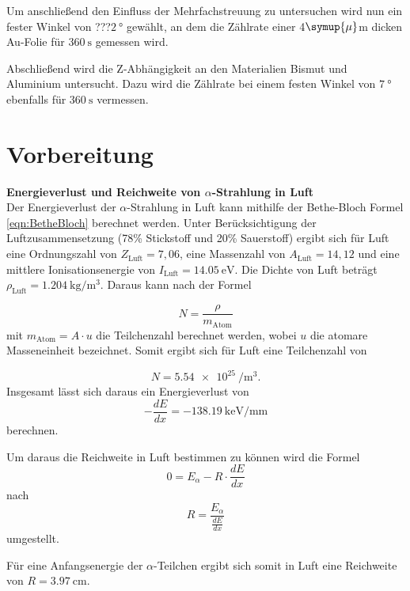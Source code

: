 Um anschließend den Einfluss der Mehrfachstreuung zu untersuchen wird nun ein fester Winkel von ???$\SI{2}{\degree}$
gewählt, an dem die Zählrate einer 4\:$\symup{\mu}$m dicken Au-Folie für $\SI{360}{\s}$ gemessen wird.

Abschließend wird die Z-Abhängigkeit an den Materialien Bismut und Aluminium untersucht. Dazu wird die Zählrate
bei einem festen Winkel von $\SI{7}{\degree}$ ebenfalls für $\SI{360}{\s}$ vermessen.


\section{Vorbereitung}
\textbf{Energieverlust und Reichweite von $\alpha$-Strahlung in Luft}\\
Der Energieverlust der $\alpha$-Strahlung in Luft kann mithilfe der Bethe-Bloch Formel \ref{eqn:BetheBloch} berechnet
werden. Unter Berücksichtigung der Luftzusammensetzung (78\% Stickstoff und 20\% Sauerstoff) ergibt sich für
Luft eine Ordnungszahl von $Z_{\text{Luft}}=7,06$, eine Massenzahl von $A_{\text{Luft}}=14,12$ und eine
mittlere Ionisationsenergie von $I_{\text{Luft}}=\SI{14,05}{\eV}$.
Die Dichte von Luft beträgt $\rho_{\text{Luft}}=\SI{1,204}{\kg\per\m^3}$. Daraus kann nach der Formel

\begin{equation}
  N=\frac{\rho}{m_{\text{Atom}}}
  \label{eqn:Anzahl}
\end{equation}
mit $m_{\text{Atom}}=A\cdot u$ die Teilchenzahl berechnet werden, wobei $u$ die
atomare Masseneinheit bezeichnet. Somit ergibt sich für Luft eine Teilchenzahl von

\begin{equation}
  N=\SI{5,54e25}{\per\m^3}.
\end{equation}
Insgesamt lässt sich daraus ein Energieverlust von
\begin{equation}
  -\frac{dE}{dx}=\SI{-138,19}{\kilo\eV\per\mm}
\end{equation}
berechnen.

Um daraus die Reichweite in Luft bestimmen zu können wird die Formel
\begin{equation}
  0=E_{\alpha}-R\cdot\frac{dE}{dx}
\end{equation}
nach
\begin{equation}
  R=\frac{E_{\alpha}}{\frac{dE}{dx}}
\end{equation}
umgestellt.

Für eine Anfangsenergie der $\alpha$-Teilchen ergibt sich somit in Luft eine
Reichweite von $R=\SI{3,97}{\cm}$.

